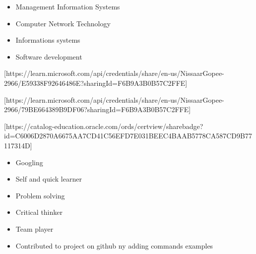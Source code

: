 \documentclass[10pt,a4paper,ragged2e,withhyper]{altacv}
\begin{document}
\begin{paracol}{2}

\begin{itemize}[label=\textcolor{DarkPastelRed}{$\triangleright$}]
\item Management Information Systems
\item Computer Network Technology
\item Informations systems
\item Software development
\end{itemize}



[https://learn.microsoft.com/api/credentials/share/en-us/NissaarGopee-2966/E59338F92646486E?sharingId=F6B9A3B0B57C2FFE]

\divider


[https://learn.microsoft.com/api/credentials/share/en-us/NissaarGopee-2966/79BE664389B9DF06?sharingId=F6B9A3B0B57C2FFE]

\divider


[https://catalog-education.oracle.com/ords/certview/sharebadge?id=C6006D2870A6675AA7CD41C56EFD7E031BEEC4BAAB5778CA587CD9B77117314D]

\newpage

\begin{multicols}{2}
\begin{itemize}[label=\textcolor{DarkPastelRed}{$\triangleright$}]
\item Googling
\item Self and quick learner
\item Problem solving
\item Critical thinker
\item Team player 
\end{itemize}
\end{multicols}


\begin{itemize}
\item Contributed to project on github ny adding commands examples
\end{itemize}


\end{paracol}
\end{document}
